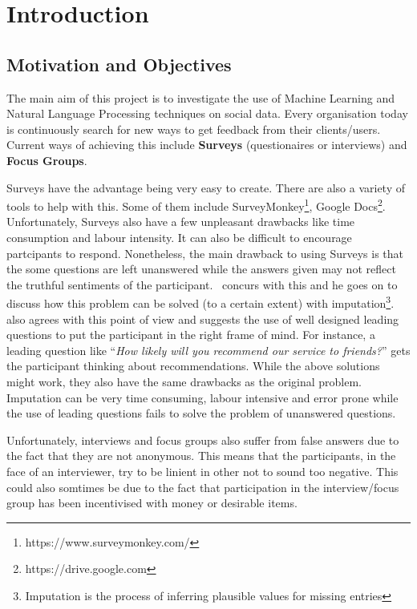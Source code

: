 
\chapter{Introduction}


\section{Motivation and Objectives}
The main aim of this project is to investigate the use of Machine Learning and Natural Language
Processing techniques on social data. Every organisation today is continuously search for new ways
to get feedback from their clients/users. Current ways of achieving this include
\textbf{Surveys} (questionaires or interviews) and \textbf{Focus Groups}.

Surveys have the advantage being very easy to create. There are also a variety of tools to help with
this. Some of them include SurveyMonkey\footnote{https://www.surveymonkey.com/}, Google
Docs\footnote{https://drive.google.com}. Unfortunately, Surveys also have a few unpleasant drawbacks
like time consumption and labour intensity. It can also be difficult to encourage partcipants to
respond. Nonetheless, the main drawback to using Surveys is that the some questions are left
unanswered while the answers given may not reflect the truthful sentiments of the
participant.~\cite{DonaldBRubin1987} concurs with this and he goes on to discuss how this problem
can be solved (to a certain extent) with imputation\footnote{Imputation is the process of inferring
plausible values for missing entries}.~\cite{BobEHayes2008} also agrees with this point of view and
suggests the use of well designed leading questions to put the participant in the right frame of
mind. For instance, a leading question like ``\textit{How likely will you recommend our service to
friends?}'' gets the participant thinking about recommendations. While the above solutions might
work, they also have the same drawbacks as the original problem. Imputation can be very time
consuming, labour intensive and error prone while the use of leading questions fails to solve the
problem of unanswered questions.

Unfortunately, interviews and focus groups also suffer from false answers due to the fact that they
are not anonymous. This means that the participants, in the face of an interviewer, try to be
linient in other not to sound too negative. This could also somtimes be due to the fact that
participation in the interview/focus group has been incentivised with money or desirable items.

